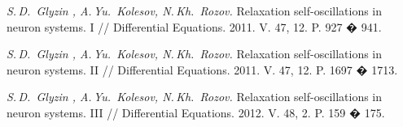 \documentclass[fullscreen=true, unicode, bookmarks=false]{beamer}
\begin{document}
\begin{frame}
\frametitle{} 

\textit{S.\,D.~Glyzin , A.\,Yu.~Kolesov, N.\,Kh.~Rozov. } 
{Relaxation self-oscillations in neuron systems. I //
Differential Equations. 2011. V. 47,  12. P. 927 � 941. }

\vspace{1cm}

\textit{S.\,D.~Glyzin , A.\,Yu.~Kolesov, N.\,Kh.~Rozov. } 
{Relaxation self-oscillations in neuron systems. II //
Differential Equations. 2011. V. 47,  12. P. 1697 � 1713. }

\vspace{1cm}

\textit{S.\,D.~Glyzin , A.\,Yu.~Kolesov, N.\,Kh.~Rozov. } 
{Relaxation self-oscillations in neuron systems. III //
Differential Equations. 2012. V. 48,  2. P. 159 � 175. }

\end{frame}
\end{document}
